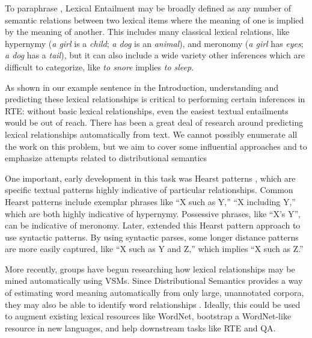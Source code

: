 To paraphrase , Lexical Entailment may be broadly
defined as any number of semantic relations between two lexical items where the
meaning of one is implied by the meaning of another.
This includes many classical lexical relations, like hypernymy
({\em a girl} is a {\em child}; {\em a dog} is an {\em animal}), and meronomy
({\em a girl} has {\em eyes}; {\em a dog} has a {\em tail}), but it can also include a
wide variety other inferences which are difficult to categorize,
like {\em to snore} implies {\em to sleep}.

As shown in our example
sentence in the Introduction, understanding and predicting these lexical relationships
is critical to performing certain inferences in RTE: without basic lexical
relationships, even the easiest textual entailments would be out of
reach. There has been a great deal of research around predicting lexical
relationships automatically from text. We cannot possibly enumerate all the
work on this problem, but we aim to cover some influential approaches and to
emphasize attempts related to distributional semantics

One important, early development in this task was Hearst patterns
\cite{hearst:1992:coling}, which are specific textual patterns highly
indicative of particular relationships. Common Hearst patterns include
exemplar phrases like ``X such as Y,'' ``X including Y,'' which are both highly
indicative of hypernymy. Possessive phrases, like ``X's Y'', can be indicative
of meronomy. Later,
 extended this Hearst pattern approach
to use syntactic patterns. By using syntactic parses, some longer distance patterns
are more easily captured, like ``X such as Y and Z,'' which implies ``X such as Z.''

More recently, groups have begun researching how lexical relationships may be
mined automatically using VSMs. Since Distributional
Semantics provides a way of estimating word meaning automatically from only
large, unannotated corpora, they may also be able to identify
word relationships \cite{baroni:2011:gems,baroni:2012:eacl}. Ideally, this
could be used to augment existing lexical resources like WordNet, bootstrap
a WordNet-like resource in new languages, and help downstream tasks like RTE
and QA.

